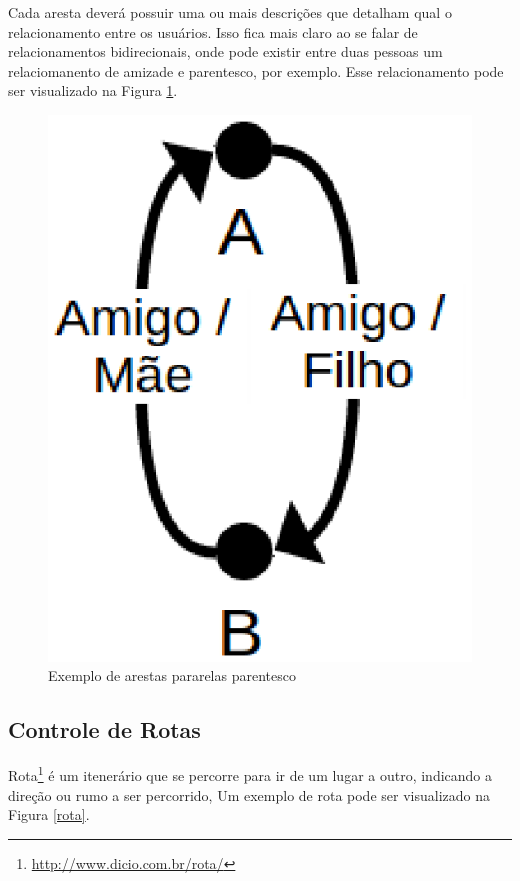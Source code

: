 Cada aresta deverá possuir uma ou mais descrições que detalham qual o relacionamento entre os usuários. Isso fica mais claro ao se falar de relacionamentos bidirecionais, onde pode existir entre duas pessoas um relaciomanento de amizade e parentesco, por exemplo. Esse relacionamento pode ser visualizado na Figura \ref{parentes}.

\begin{figure}[!h]
	\centering
	\includegraphics[scale=0.45]{figuras/capitulo5/parentes.eps}
	\caption{Exemplo de arestas pararelas parentesco}
	\label{parentes}
\end{figure}

\subsection{Controle de Rotas}

Rota\footnote{\url{http://www.dicio.com.br/rota/}} é um itenerário que se percorre para ir de um lugar a outro, indicando a direção ou rumo a ser percorrido, Um exemplo de rota pode ser visualizado na Figura \ref{rota}.


